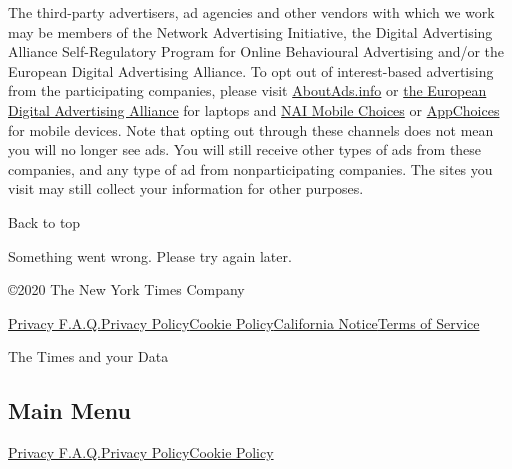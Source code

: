 The third-party advertisers, ad agencies and other vendors with which we
work may be members of the Network Advertising Initiative, the Digital
Advertising Alliance Self-Regulatory Program for Online Behavioural
Advertising and/or the European Digital Advertising Alliance. To opt out
of interest-based advertising from the participating companies, please
visit \href{http://optout.aboutads.info/?c=2\&lang=EN}{AboutAds.info} or
\href{http://www.youronlinechoices.eu/}{the European Digital Advertising
Alliance} for laptops and
\href{https://www.networkadvertising.org/mobile-choice/}{NAI Mobile
Choices} or \href{https://youradchoices.com/appchoices}{AppChoices} for
mobile devices. Note that opting out through these channels does not
mean you will no longer see ads. You will still receive other types of
ads from these companies, and any type of ad from nonparticipating
companies. The sites you visit may still collect your information for
other purposes.

Back to top

Something went wrong. Please try again later.

©2020 The New York Times Company

\href{/privacy}{Privacy F.A.Q.}\href{/privacy/privacy-policy}{Privacy
Policy}\href{/privacy/cookie-policy}{Cookie
Policy}\href{/privacy/california-notice}{California
Notice}\href{https://help.nytimes.com/hc/en-us/articles/115014893428-Terms-of-service}{Terms
of Service}

The Times and your Data

\hypertarget{main-menu}{%
\subsection{Main Menu}\label{main-menu}}

\href{/privacy}{Privacy F.A.Q.}\href{/privacy/privacy-policy}{Privacy
Policy}\href{/privacy/cookie-policy}{Cookie Policy}
